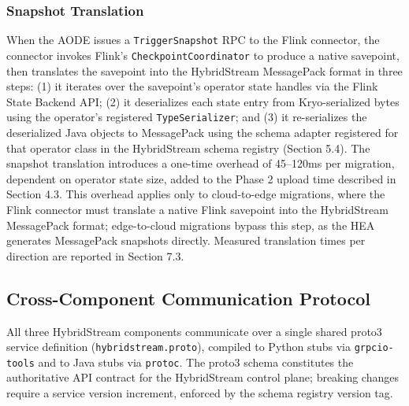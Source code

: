 \documentclass[preprint,review,12pt]{elsarticle}
\begin{document}
\subsubsection{Snapshot Translation}\label{snapshot-translation}

When the AODE issues a \texttt{TriggerSnapshot} RPC to the Flink connector, the connector invokes Flink's \texttt{CheckpointCoordinator} to produce a native savepoint, then translates the savepoint into the HybridStream MessagePack format in three steps: (1) it iterates over the savepoint's operator state handles via the Flink State Backend API; (2) it deserializes each state entry from Kryo-serialized bytes using the operator's registered \texttt{TypeSerializer}; and (3) it re-serializes the deserialized Java objects to MessagePack using the schema adapter registered for that operator class in the HybridStream schema registry (Section 5.4). The snapshot translation introduces a one-time overhead of 45--120ms per migration, dependent on operator state size, added to the Phase 2 upload time described in Section 4.3. This overhead applies only to cloud-to-edge migrations, where the Flink connector must translate a native Flink savepoint into the HybridStream MessagePack format; edge-to-cloud migrations bypass this step, as the HEA generates MessagePack snapshots directly. Measured translation times per direction are reported in Section 7.3.

\subsection{Cross-Component Communication Protocol}\label{cross-component-communication-protocol}

All three HybridStream components communicate over a single shared proto3 service definition (\texttt{hybridstream.proto}), compiled to Python stubs via \texttt{grpcio-tools} and to Java stubs via \texttt{protoc}. The proto3 schema constitutes the authoritative API contract for the HybridStream control plane; breaking changes require a service version increment, enforced by the schema registry version tag.
\end{document}
